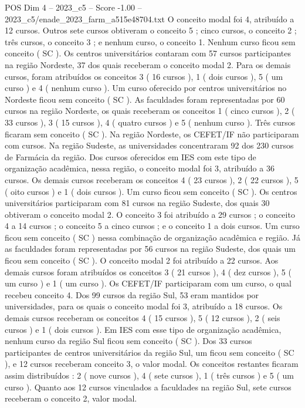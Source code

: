 \begin{textsample}{POS Dim 4 – 2023\_c5 – Score -1.00 – 2023\_c5/enade\_2023\_farm\_a515e48704.txt}
O conceito modal foi 4, atribuído a 12 cursos.
Outros sete cursos obtiveram o conceito 5 ; cinco cursos, o conceito 2 ; três cursos, o conceito 3 ; e nenhum curso, o conceito 1.
Nenhum curso ficou sem conceito ( SC ).
Os centros universitários contaram com 57 cursos participantes na região Nordeste, 37 dos quais receberam o conceito modal 2.
Para os demais cursos, foram atribuídos os conceitos 3 ( 16 cursos ), 1 ( dois cursos ), 5 ( um curso ) e 4 ( nenhum curso ).
Um curso oferecido por centros universitários no Nordeste ficou sem conceito ( SC ).
As faculdades foram representadas por 60 cursos na região Nordeste, os quais receberam os conceitos 1 ( cinco cursos ), 2 ( 33 cursos ), 3 ( 15 cursos ), 4 ( quatro cursos ) e 5 ( nenhum curso ).
Três cursos ficaram sem conceito ( SC ).
Na região Nordeste, os CEFET/IF não participaram com cursos.
Na região Sudeste, as universidades concentraram 92 dos 230 cursos de Farmácia da região.
Dos cursos oferecidos em IES com este tipo de organização acadêmica, nessa região, o conceito modal foi 3, atribuído a 36 cursos.
Os demais cursos receberam os conceitos 4 ( 23 cursos ), 2 ( 22 cursos ), 5 ( oito cursos ) e 1 ( dois cursos ).
Um curso ficou sem conceito ( SC ).
Os centros universitários participaram com 81 cursos na região Sudeste, dos quais 30 obtiveram o conceito modal 2.
O conceito 3 foi atribuído a 29 cursos ; o conceito 4 a 14 cursos ; o conceito 5 a cinco cursos ; e o conceito 1 a dois cursos.
Um curso ficou sem conceito ( SC ) nessa combinação de organização acadêmica e região.
Já as faculdades foram representadas por 56 cursos na região Sudeste, dos quais um ficou sem conceito ( SC ).
O conceito modal 2 foi atribuído a 22 cursos.
Aos demais cursos foram atribuídos os conceitos 3 ( 21 cursos ), 4 ( dez cursos ), 5 ( um curso ) e 1 ( um curso ).
Os CEFET/IF participaram com um curso, o qual recebeu conceito 4.
Dos 99 cursos da região Sul, 53 eram mantidos por universidades, para os quais o conceito modal foi 3, atribuído a 18 cursos.
Os demais cursos receberam os conceitos 4 ( 15 cursos ), 5 ( 12 cursos ), 2 ( seis cursos ) e 1 ( dois cursos ).
Em IES com esse tipo de organização acadêmica, nenhum curso da região Sul ficou sem conceito ( SC ).
Dos 33 cursos participantes de centros universitários da região Sul, um ficou sem conceito ( SC ), e 12 cursos receberam conceito 3, o valor modal.
Os conceitos restantes ficaram assim distribuídos : 2 ( nove cursos ), 4 ( sete cursos ), 1 ( três cursos ) e 5 ( um curso ).
Quanto aos 12 cursos vinculados a faculdades na região Sul, sete cursos receberam o conceito 2, valor modal.

\end{textsample}
